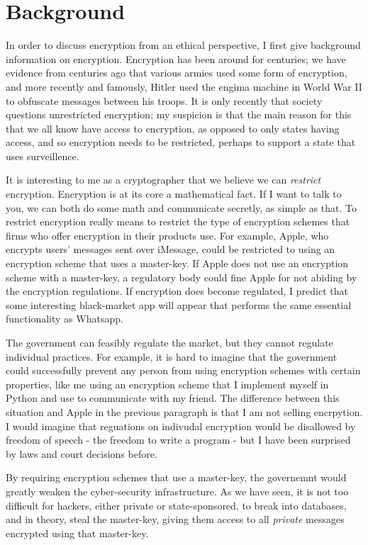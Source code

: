 \documentclass[11pt]{article}
\begin{document}
\section{Background}
In order to discuss encryption from an ethical perspective, I first give background information on encryption.
Encryption has been around for centuries; we have evidence from centuries ago that various armies used some form of encryption, and more recently and famously, Hitler used the engima machine in World War II to obfuscate messages between his troops.
It is only recently that society questions unrestricted encryption; my suspicion is that the main reason for this that we all know have access to encryption, as opposed to only states having access, and so encryption needs to be restricted, perhaps to support a state that uses surveillence.

It is interesting to me as a cryptographer that we believe we can \textit{restrict} encryption.
Encryption is at its core a mathematical fact.
If I want to talk to you, we can both do some math and communicate secretly, as simple as that.
To restrict encryption really means to restrict the type of encryption schemes that firms who offer encryption in their products use.
For example, Apple, who encrypts users' messages sent over iMessage, could be restricted to using an encryption scheme that uses a master-key.
If Apple does not use an encryption scheme with a master-key, a regulatory body could fine Apple for not abiding by the encryption regulations.
If encryption does become regulated, I predict that some interesting black-market app will appear that performs the same essential functionality as Whatsapp.

The government can feasibly regulate the market, but they cannot regulate individual practices.
For example, it is hard to imagine that the government could successfully prevent any person from using encryption schemes with certain properties, like me using an encryption scheme that I implement myself in Python and use to communicate with my friend.
The difference between this situation and Apple in the previous paragraph is that I am not selling encrpytion.
I would imagine that reguations on indivudal encryption would be disallowed by freedom of speech - the freedom to write a program - but I have been surprised by laws and court decisions before.

By requiring encryption schemes that use a master-key, the governemnt would greatly weaken the cyber-security infrastructure.
As we have seen, it is not too difficult for hackers, either private or state-sponsored, to break into databases, and in theory, steal the master-key, giving them access to all \textit{private} messages encrypted using that master-key.
\end{document}
